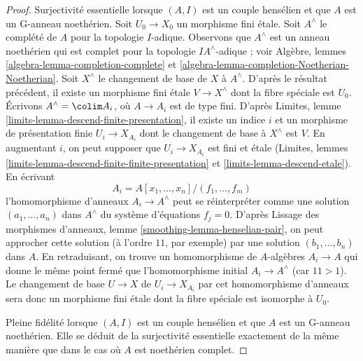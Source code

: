 \begin{proof}
\medskip\noindent
Surjectivité essentielle lorsque $(A, I)$ est un couple hensélien
et que $A$ est un G-anneau noethérien.
Soit $U_0 \to X_0$ un morphisme fini étale.
Soit $A^\wedge$ le complété de $A$ pour la topologie $I$-adique.
Observons que $A^\wedge$ est un anneau noethérien qui est
complet pour la topologie $IA^\wedge$-adique ; voir Algèbre, lemmes
\ref{algebra-lemma-completion-complete} et
\ref{algebra-lemma-completion-Noetherian-Noetherian}.
Soit $X^\wedge$ le changement de base de $X$ à $A^\wedge$.
D'après le résultat précédent, il existe un morphisme fini étale
$V \to X^\wedge$ dont la fibre spéciale est $U_0$.
Écrivons $A^\wedge = \colim A_i$, où $A \to A_i$ est de type fini.
D'après Limites, lemme \ref{limits-lemma-descend-finite-presentation},
il existe un indice $i$ et un morphisme de présentation finie $U_i \to X_{A_i}$
dont le changement de base à $X^\wedge$ est $V$. En augmentant $i$,
on peut supposer que $U_i \to X_{A_i}$ est fini et étale
(Limites, lemmes \ref{limits-lemma-descend-finite-finite-presentation} et
\ref{limits-lemma-descend-etale}). En écrivant
$$
A_i = A[x_1, \ldots, x_n]/(f_1, \ldots, f_m)
$$
l'homomorphisme d'anneaux $A_i \to A^\wedge$ peut se réinterpréter comme une solution
$(a_1, \ldots, a_n)$ dans $A^\wedge$ du système d'équations $f_j = 0$.
D'après Lissage des morphismes d'anneaux, lemme \ref{smoothing-lemma-henselian-pair},
on peut approcher cette solution (à l'ordre $11$, par exemple) par une solution
$(b_1, \ldots, b_n)$ dans $A$. En retraduisant, on trouve un homomorphisme de $A$-algèbres
$A_i \to A$ qui donne le même point fermé que l'homomorphisme initial
$A_i \to A^\wedge$ (car $11 > 1$). Le changement de base $U \to X$ de $U_i \to X_{A_i}$
par cet homomorphisme d'anneaux sera donc un morphisme fini étale dont la
fibre spéciale est isomorphe à $U_0$.

\medskip\noindent
Pleine fidélité lorsque $(A, I)$ est un couple hensélien et que $A$ est un
G-anneau noethérien. Elle se déduit de la surjectivité essentielle exactement de la même
manière que dans le cas où $A$ est noethérien complet.


\end{proof}
